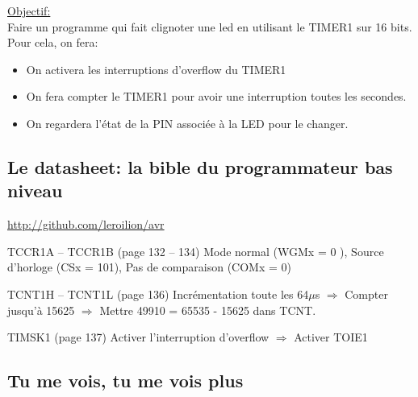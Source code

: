 \documentclass{beamer}
\def\Pause{2}
\begin{document}
\begin{frame}
  \underline{Objectif:}\\
  Faire un programme qui fait clignoter une led en utilisant le TIMER1 sur 16 bits.\\Pour cela, on fera:\\
  \begin{itemize}
\ifthenelse{\equal{\Pause}{1}}
{
  \pause
}{}
    \item On activera les interruptions d'overflow du TIMER1
\ifthenelse{\equal{\Pause}{1}}
{
  \pause
}{}
    \item On fera compter le TIMER1 pour avoir une interruption toutes les secondes.
\ifthenelse{\equal{\Pause}{1}}
{
  \pause
}{}
    \item On regardera l'\'etat de la PIN associ\'ee \`a la LED pour le changer.
  \end{itemize}
\end{frame}


\subsection{Le datasheet: la bible du programmateur bas niveau}

\begin{frame}
  \hyperlink{http://github.com/leroilion/avr/tree/master/datasheet/Atmegaxx8.pdf}{http://github.com/leroilion/avr}
\ifthenelse{\equal{\Pause}{1}}
{
  \pause
}{}
  \begin{block}{TCCR1A -- TCCR1B (page 132 -- 134)}
    Mode normal (WGMx = 0 ), Source d'horloge (CSx = 101), Pas de comparaison (COMx = 0) 
  \end{block}
\ifthenelse{\equal{\Pause}{1}}
{
  \pause
}{}
  \begin{block}{TCNT1H -- TCNT1L (page 136) }
    Incr\'ementation toute les 64$\mu$s \pause $\Longrightarrow$ Compter jusqu'\`a 15625 \pause $\Longrightarrow$ Mettre 49910 = 65535 - 15625 dans TCNT.
  \end{block}
\ifthenelse{\equal{\Pause}{1}}
{
  \pause
}{}
  \begin{block}{TIMSK1 (page 137)}
    Activer l'interruption d'overflow \pause $\Longrightarrow$ Activer TOIE1
  \end{block}
\end{frame}

\subsection{Tu me vois, tu me vois plus}
\end{document}
